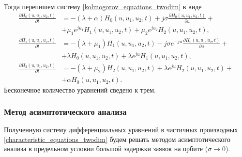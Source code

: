 Тогда перепишем систему \eqref{kolmogorov_equations_twodim} в виде
\begin{equation} \label{characteristic_equations_twodim}
	\begin{split}
		\frac{{\partial H_{0}(u,u_{1},u_{2},t)}}{{\partial t}} &= -(\lambda + \alpha)H_{0}(u,u_{1},u_{2},t) + j\sigma
		\frac{{\partial H_{0}(u,u_{1},u_{2},t)}}{{\partial u}} +\\  &+ \mu_{1} e^{ju_{1}}H_{1}(u,u_{1},u_{2},t) + \mu_{2}e^{ju_{2}}H_{2}(u,u_{1},u_{2},t) ,
		\\
		\frac{{\partial H_{1}(u,u_{1},u_{2},t)}}{{\partial t}} &= -(\lambda + \mu_{1})H_{1}(u,u_{1},u_{2},t) - j\sigma e^{-ju}
		\frac{{\partial H_{0}(u,u_{1},u_{2},t)}}{{\partial u}} +\\  &+ \lambda H_{0}(u,u_{1},u_{2},t) + \lambda e^{ju}H_{1}(u,u_{1},u_{2},t) ,
		\\
		\frac{{\partial H_{2}(u,u_{1},u_{2},t)}}{{\partial t}} &= -(\lambda + \mu_{2})H_{2}(u,u_{1},u_{2},t)  + \lambda e^{ju}H_{2}(u,u_{1},u_{2},t) +\\  &+ \alpha H_{0}(u,u_{1},u_{2},t).
	\end{split}
\end{equation}  
Бесконечное количество уравнений сведено к трем.

\subsubsection{Метод асимптотического анализа}
Полученную систему дифференциальных уравнений в частичных производных  \eqref{characteristic_equations_twodim} будем решать методом асимптотического анализа в предельном условии большой задержки заявок на орбите ($\sigma \xrightarrow{} 0$).

